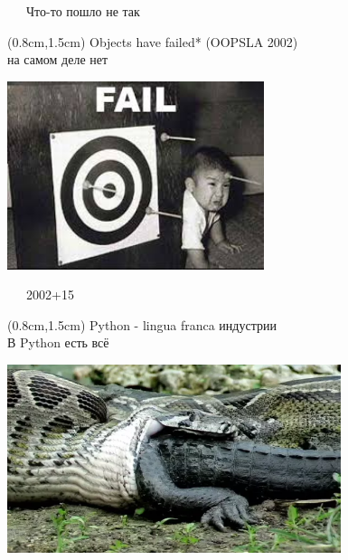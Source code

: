 \documentclass[xetex,18pt,aspectratio=43]{beamer}
\begin{document}
\begin{Large}
\begin{frame}{\ \ \ Что-то пошло не так}
\begin{textblock*}{\framewidth}(0.8cm,1.5cm)
Objects have failed* (OOPSLA 2002)\\
{\small * на самом деле нет}
\begin{minipage}{\textwidth}
  \centering
  \includegraphics[height=5.5cm]{img/fail}
\end{minipage}
\end{textblock*}
\end{frame}

\begin{frame}{\ \ \ 2002+15}
\begin{textblock*}{\framewidth}(0.8cm,1.5cm)
Python - lingua franca индустрии\\
{\small В Python есть всё}
\begin{minipage}{\textwidth}
  \centering
  \includegraphics[height=5.5cm]{img/python}
\end{minipage}
\end{textblock*}
\end{frame}


\end{Large}
\end{document}
